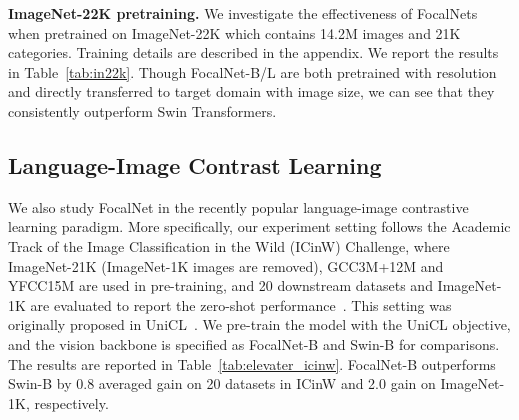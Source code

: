 \documentclass{article}
\begin{document}
\textbf{ImageNet-22K pretraining.} We investigate the effectiveness of FocalNets when pretrained on ImageNet-22K which contains 14.2M images and 21K categories. Training details are described in the appendix. We report the results in Table~\ref{tab:in22k}. Though FocalNet-B/L are both pretrained with  resolution and directly transferred to target domain with  image size, we can see that they consistently outperform Swin Transformers.








\subsection{Language-Image Contrast Learning}
We also study FocalNet in the recently popular language-image contrastive learning paradigm. More specifically, our experiment setting follows the Academic Track of the Image Classification in the Wild (ICinW) Challenge, where ImageNet-21K (ImageNet-1K images are removed), GCC3M+12M and YFCC15M are used in pre-training, and 20 downstream datasets and ImageNet-1K are evaluated to report the zero-shot performance~\cite{li2022elevater}. This setting was originally proposed in UniCL~\cite{yang2022unicl}.  We pre-train the model with the UniCL objective, and the vision backbone is specified as FocalNet-B and Swin-B for comparisons. The results are reported in Table~\ref{tab:elevater_icinw}. FocalNet-B outperforms Swin-B by 0.8 averaged gain on 20 datasets in ICinW and 2.0 gain on ImageNet-1K, respectively. 
\end{document}

